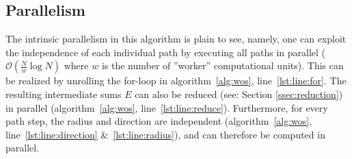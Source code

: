%
%




\subsection{Parallelism}

The intrinsic parallelism in this algorithm is plain to see, namely, one can
exploit the independence of each individual path by executing all paths in parallel
($\mathcal{O}(\frac{N}{w} \log{}N)$ where $w$ is the number of ''worker'' computational units).
This can be realized by unrolling the for-loop in algorithm~\ref{alg:wos}, line~\ref{lst:line:for}.
The resulting intermediate sums $E$ can also be reduced (see: Section \ref{ssec:reduction}) in parallel (algorithm~\ref{alg:wos},
line~\ref{lst:line:reduce}).  Furthermore, for every path step,
the radius and direction are independent (algorithm~\ref{alg:wos}, line~\ref{lst:line:direction} \&~\ref{lst:line:radius}),
 and can therefore be computed in parallel. \cite{Muller,DeLaurentis,Bornemann}
